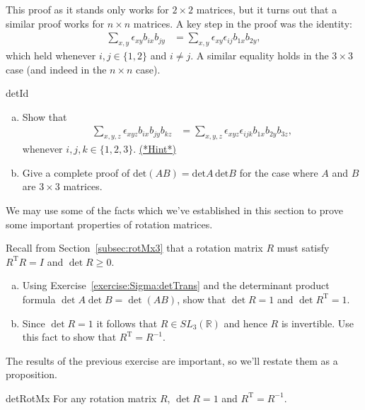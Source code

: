 This proof as it stands only works for $2 \times 2$ matrices, but it turns out that a similar proof works for $n \times n$ matrices.  A key step in the proof was the identity:
\begin{align*}
\sum_{x,y} \epsilon_{xy} b_{ix}b_{jy}&= \sum_{x,y} \epsilon_{xy}\epsilon_{ij} b_{1x}b_{2y},
\end{align*}
which held whenever $i,j \in \{1,2\}$ and $i \neq j$. A similar equality holds in the $3 \times 3$ case (and indeed in the $n \times n$ case).

\begin{exercise}{detId}
\begin{enumerate}[(a)]
\item
Show that
\begin{align*}
\sum_{x,y,z}  \epsilon_{xyz} b_{ix}b_{jy}b_{kz}&=\sum_{x,y,z} \epsilon_{xyz}\epsilon_{ijk} b_{1x}b_{2y}b_{3z},
\end{align*}
whenever $i,j,k \in \{1,2,3\}$.
\hyperref[sec:sigma:hints]{(*Hint*)} 
\item
Give a complete proof of $\text{det}(AB)= \text{det}A \,\text{det}B$ for the case where $A$ and $B$ are $3 \times 3$ matrices.
\end{enumerate}
\end{exercise}

We may use some of the facts which we've established in this section to prove some important properties of rotation matrices. 

\begin{exercise}{}
Recall from Section~\ref{subsec:rotMx3} that a rotation matrix $R$ must satisfy $R^{\text{T}} R = I$ and $\det R \ge 0$.
\begin{enumerate}[(a)]
\item
Using Exercise~\ref{exercise:Sigma:detTrans} and the determinant product formula $\det A \det B = \det(AB)$, show that $\det R = 1$ and $\det R^{\text{T}}=1$. 
\item
Since $\det R = 1$ it follows that $R \in SL_3(\mathbb{R})$ and hence $R$ is invertible. Use this fact to show that $R^{\text{T}} = R^{-1}$.
\end{enumerate}
\end{exercise}

The results of the previous exercise are important, so we'll restate them as a proposition.

\begin{prop}{detRotMx} For any rotation matrix $R$, $\det R = 1$ and $R^{\text{T}} = R^{-1}$.
\end{prop}

